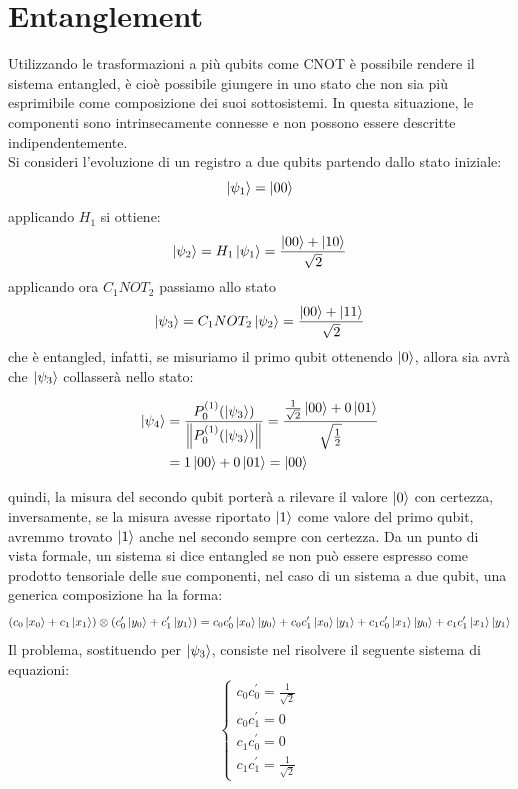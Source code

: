 \documentclass[12pt,a4paper,openright]{report}
\newcommand{\norm}[1]{\left\lVert#1\right\rVert}
\begin{document}
\section{Entanglement}
Utilizzando le trasformazioni a più qubits come CNOT è possibile rendere il sistema entangled, è cioè possibile giungere in uno stato che non sia più esprimibile come composizione dei suoi sottosistemi.
In questa situazione, le componenti sono intrinsecamente connesse e non possono essere descritte indipendentemente.\\
Si consideri l'evoluzione di un registro a due qubits partendo dallo stato iniziale:    
\[
    \ket{\psi_1}= \ket{00}
\] 
applicando $H_1$ si ottiene:
\[
    \ket{\psi_2} = H_1\ket{\psi_1} = \frac{ \ket{00} + \ket{10} }{\sqrt2}
\]
applicando ora $C_1NOT_2$ passiamo allo stato 
\[
    \ket{\psi_3} = C_1NOT_2\ket{\psi_2} = \frac{ \ket{00} + \ket{11} }{\sqrt2}
\]
che è entangled, infatti, se misuriamo il primo qubit ottenendo $\ket0$, allora sia avrà che $\ket{\psi_3}$ collasserà nello stato:
\begin{center}
    \begin{align*}
        \ket{\psi_4} &= \frac{{P^{(1)}_0}(\ket{\psi_3}) }{ \norm{{P^{(1)}_0}(\ket{\psi_3})} } = \frac{  \frac{1}{\sqrt2}\ket{00} + 0\ket{01}  }{\sqrt{\frac{1}{2}}}\\*
        &=1\ket{00} + 0\ket{01} = \ket{00}
    \end{align*}
\end{center}
quindi, la misura del secondo qubit porterà a rilevare il valore $\ket0$ con certezza, inversamente, se la misura avesse riportato $\ket1$ come valore del primo qubit, avremmo trovato $\ket1$ anche nel secondo
sempre con certezza. Da un punto di vista formale, un sistema si dice entangled se non può essere espresso come prodotto tensoriale delle sue componenti, nel caso di un sistema a due qubit, una generica composizione
ha la forma:
    \[
        (c_0\ket{x_0} + c_1\ket{x_1}) \otimes (c^{\prime}_0\ket{y_0} + c^{\prime}_1\ket{y_1}) = c_0c^{\prime}_0\ket{x_0}\ket{y_0} + c_0c^{\prime}_1\ket{x_0}\ket{y_1} + c_1c^{\prime}_0\ket{x_1}\ket{y_0} + c_1c^{\prime}_1\ket{x_1}\ket{y_1}
    \]
Il problema, sostituendo per $\ket{\psi_3}$, consiste nel risolvere il seguente sistema di equazioni:
\[\begin{cases} 
    c_0c^{\prime}_0 = \frac{1}{\sqrt2} \\ 
    c_0c^{\prime}_1 = 0\\ 
    c_1c^{\prime}_0 = 0\\
    c_1c^{\prime}_1 = \frac{1}{\sqrt2}
\end{cases}
\]  
\end{document}
